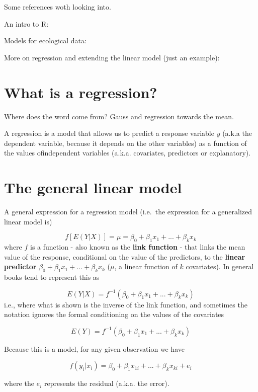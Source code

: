 \documentclass[
]{book}
\begin{document}
Some references woth looking into.

An intro to R: \citep{Zuur2009a}

Models for ecological data: \citep{Zuur2007}

More on regression and extending the linear model (just an example): \citep{Faraway2006}\citep{Zuur2009b}

\hypertarget{what-is-a-regression}{%
\section{What is a regression?}\label{what-is-a-regression}}

Where does the word come from? Gauss and regression towards the mean.

A regression is a model that allows us to predict a response variable \(y\) (a.k.a the dependent variable, because it depends on the other variables) as a function of the values ofindependent variables (a.k.a. covariates, predictors or explanatory).

\hypertarget{the-general-linear-model}{%
\section{The general linear model}\label{the-general-linear-model}}

A general expression for a regression model (i.e.~the expression for a generalized linear model is)

\[ f[E(Y|X)] = \mu = \beta_0+\beta_1 x_1 + ... + \beta_k x_k \]
where \(f\) is a function - also known as the \textbf{link function} - that links the mean value of the response, conditional on the value of the predictors, to the \textbf{linear predictor} \(\beta_0+\beta_1 x_1 + ... + \beta_k x_k\) (\(\mu\), a linear function of \(k\) covariates). In general books tend to represent this as

\[ E(Y|X) =  f^{-1}(\beta_0+\beta_1 x_1 + ... + \beta_k x_k) \]
i.e., where what is shown is the inverse of the link function,
and sometimes the notation ignores the formal conditioning on the values of the covariates

\[ E(Y) =  f^{-1}(\beta_0+\beta_1 x_1 + ... + \beta_k x_k) \]

Because this is a model, for any given observation we have

\[ f{(y_i|x_i)} =  \beta_0+\beta_1 x_{1i} + ... + \beta_k x_{ki} + e_i \]

where the \(e_i\) represents the residual (a.k.a. the error).
\end{document}
